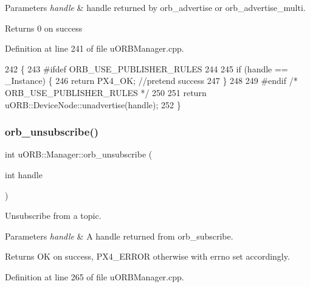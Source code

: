\begin{DoxyParams}{Parameters}
{\em handle} & handle returned by orb\+\_\+advertise or orb\+\_\+advertise\+\_\+multi. \\
\hline
\end{DoxyParams}
\begin{DoxyReturn}{Returns}
0 on success 
\end{DoxyReturn}


Definition at line 241 of file u\+O\+R\+B\+Manager.\+cpp.


\begin{DoxyCode}
242 \{
243 \textcolor{preprocessor}{#ifdef ORB\_USE\_PUBLISHER\_RULES}
244 
245     \textcolor{keywordflow}{if} (handle == \_Instance) \{
246         \textcolor{keywordflow}{return} PX4\_OK; \textcolor{comment}{//pretend success}
247     \}
248 
249 \textcolor{preprocessor}{#endif }\textcolor{comment}{/* ORB\_USE\_PUBLISHER\_RULES */}\textcolor{preprocessor}{}
250 
251     \textcolor{keywordflow}{return} uORB::DeviceNode::unadvertise(handle);
252 \}
\end{DoxyCode}
\mbox{\label{classuORB_1_1Manager_a77539878280b749d79d2c16dc5628c81}} 
\subsubsection{\texorpdfstring{orb\+\_\+unsubscribe()}{orb\_unsubscribe()}}
{\footnotesize\ttfamily int u\+O\+R\+B\+::\+Manager\+::orb\+\_\+unsubscribe (\begin{DoxyParamCaption}\item[{int}]{handle }\end{DoxyParamCaption})}

Unsubscribe from a topic.


\begin{DoxyParams}{Parameters}
{\em handle} & A handle returned from orb\+\_\+subscribe. \\
\hline
\end{DoxyParams}
\begin{DoxyReturn}{Returns}
OK on success, P\+X4\+\_\+\+E\+R\+R\+OR otherwise with errno set accordingly. 
\end{DoxyReturn}


Definition at line 265 of file u\+O\+R\+B\+Manager.\+cpp.



